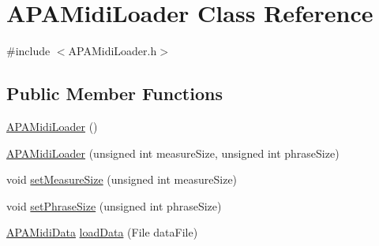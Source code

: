 \hypertarget{class_a_p_a_midi_loader}{\section{A\+P\+A\+Midi\+Loader Class Reference}
\label{class_a_p_a_midi_loader}
}


{\ttfamily \#include $<$A\+P\+A\+Midi\+Loader.\+h$>$}

\subsection*{Public Member Functions}
\begin{DoxyCompactItemize}
\item 
\hyperlink{class_a_p_a_midi_loader_a62e4870f73cc32fdb84f23c7be88c2bb}{A\+P\+A\+Midi\+Loader} ()
\item 
\hyperlink{class_a_p_a_midi_loader_a25c40f24ab01b8797a0f438d9f90cd52}{A\+P\+A\+Midi\+Loader} (unsigned int measure\+Size, unsigned int phrase\+Size)
\item 
void \hyperlink{class_a_p_a_midi_loader_a6b9dfe9c5602d4eab720cc468c90ebaa}{set\+Measure\+Size} (unsigned int measure\+Size)
\item 
void \hyperlink{class_a_p_a_midi_loader_a137cdb38017629f07c802ea8a0c9615b}{set\+Phrase\+Size} (unsigned int phrase\+Size)
\item 
\hyperlink{class_a_p_a_midi_data}{A\+P\+A\+Midi\+Data} \hyperlink{class_a_p_a_midi_loader_ad08cb2ad3a616c4e9c3cafd4bf5a6f90}{load\+Data} (File data\+File)
\end{DoxyCompactItemize}


